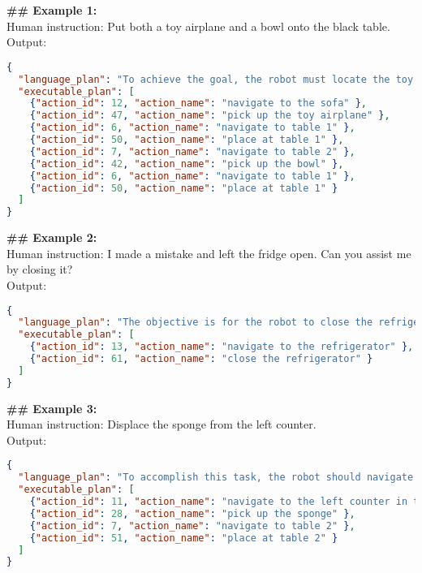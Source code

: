 \begin{tcolorbox}[colback=gray!5!white, colframe=gray!75!black, 
title=In-context examples for EB-Habitat, boxrule=0.5mm, width=\textwidth, arc=3mm, auto outer arc=true]
\textbf{\#\# Example 1:}\\
Human instruction: Put both a toy airplane and a bowl onto the black table.\\
Output:
\begin{lstlisting}[language=json]
{
  "language_plan": "To achieve the goal, the robot must locate the toy airplane and the bowl in the room and then move each item to the black table. There are two tables in the room, and the robot identifies table 1 as the black table. Therefore, the objective is to place both objects on table 1. The plan is as follows: first, navigate to the sofa, pick up the airplane, move to table 1, and place the airplane there. Then, proceed to table 2, where the bowl might be, pick up the bowl, return to table 1, and set the bowl there.",
  "executable_plan": [
    {"action_id": 12, "action_name": "navigate to the sofa" },
    {"action_id": 47, "action_name": "pick up the toy airplane" },
    {"action_id": 6, "action_name": "navigate to table 1" },
    {"action_id": 50, "action_name": "place at table 1" },
    {"action_id": 7, "action_name": "navigate to table 2" },
    {"action_id": 42, "action_name": "pick up the bowl" },
    {"action_id": 6, "action_name": "navigate to table 1" },
    {"action_id": 50, "action_name": "place at table 1" }
  ]
}
\end{lstlisting}
\textbf{\#\# Example 2:}\\
Human instruction: I made a mistake and left the fridge open. Can you assist me by closing it?\\
Output:
\begin{lstlisting}[language=json]
{
  "language_plan": "The objective is for the robot to close the refrigerator. To do so, the robot first navigates to the refrigerator and then closes it.",
  "executable_plan": [
    {"action_id": 13, "action_name": "navigate to the refrigerator" },
    {"action_id": 61, "action_name": "close the refrigerator" }
  ]
}
\end{lstlisting}
\textbf{\#\# Example 3:}\\
Human instruction: Displace the sponge from the left counter.\\
Output:
\begin{lstlisting}[language=json]
{
  "language_plan": "To accomplish this task, the robot should navigate to the left counter to pick up the sponge. It should then move to another location, such as table 2, and place the sponge there.",
  "executable_plan": [
    {"action_id": 11, "action_name": "navigate to the left counter in the kitchen"},
    {"action_id": 28, "action_name": "pick up the sponge" },
    {"action_id": 7, "action_name": "navigate to table 2" },
    {"action_id": 51, "action_name": "place at table 2" }
  ]
}
\end{lstlisting}
\end{tcolorbox}

